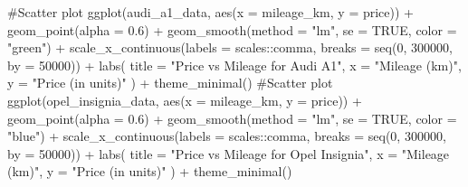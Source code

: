 \documentclass[
  letterpaper,
  DIV=11,
  numbers=noendperiod]{scrartcl}
\newenvironment{Shaded}{\begin{snugshade}}{\end{snugshade}}
\newcommand{\AttributeTok}[1]{\textcolor[rgb]{0.40,0.45,0.13}{#1}}
\newcommand{\CommentTok}[1]{\textcolor[rgb]{0.37,0.37,0.37}{#1}}
\newcommand{\ConstantTok}[1]{\textcolor[rgb]{0.56,0.35,0.01}{#1}}
\newcommand{\DecValTok}[1]{\textcolor[rgb]{0.68,0.00,0.00}{#1}}
\newcommand{\FloatTok}[1]{\textcolor[rgb]{0.68,0.00,0.00}{#1}}
\newcommand{\FunctionTok}[1]{\textcolor[rgb]{0.28,0.35,0.67}{#1}}
\newcommand{\NormalTok}[1]{\textcolor[rgb]{0.00,0.23,0.31}{#1}}
\newcommand{\SpecialCharTok}[1]{\textcolor[rgb]{0.37,0.37,0.37}{#1}}
\newcommand{\StringTok}[1]{\textcolor[rgb]{0.13,0.47,0.30}{#1}}
\begin{document}
\begin{Shaded}
\begin{Highlighting}[]
\CommentTok{\#Scatter plot}
\FunctionTok{ggplot}\NormalTok{(audi\_a1\_data, }\FunctionTok{aes}\NormalTok{(}\AttributeTok{x =}\NormalTok{ mileage\_km, }\AttributeTok{y =}\NormalTok{ price)) }\SpecialCharTok{+}
  \FunctionTok{geom\_point}\NormalTok{(}\AttributeTok{alpha =} \FloatTok{0.6}\NormalTok{) }\SpecialCharTok{+}
  \FunctionTok{geom\_smooth}\NormalTok{(}\AttributeTok{method =} \StringTok{"lm"}\NormalTok{, }\AttributeTok{se =} \ConstantTok{TRUE}\NormalTok{, }\AttributeTok{color =} \StringTok{"green"}\NormalTok{) }\SpecialCharTok{+}
  \FunctionTok{scale\_x\_continuous}\NormalTok{(}\AttributeTok{labels =}\NormalTok{ scales}\SpecialCharTok{::}\NormalTok{comma, }\AttributeTok{breaks =} \FunctionTok{seq}\NormalTok{(}\DecValTok{0}\NormalTok{, }\DecValTok{300000}\NormalTok{, }\AttributeTok{by =} \DecValTok{50000}\NormalTok{)) }\SpecialCharTok{+}
  \FunctionTok{labs}\NormalTok{(}
    \AttributeTok{title =} \StringTok{"Price vs Mileage for Audi A1"}\NormalTok{,}
    \AttributeTok{x =} \StringTok{"Mileage (km)"}\NormalTok{,}
    \AttributeTok{y =} \StringTok{"Price (in units)"}
\NormalTok{  ) }\SpecialCharTok{+}
  \FunctionTok{theme\_minimal}\NormalTok{()}
\CommentTok{\#Scatter plot}
\FunctionTok{ggplot}\NormalTok{(opel\_insignia\_data, }\FunctionTok{aes}\NormalTok{(}\AttributeTok{x =}\NormalTok{ mileage\_km, }\AttributeTok{y =}\NormalTok{ price)) }\SpecialCharTok{+}
  \FunctionTok{geom\_point}\NormalTok{(}\AttributeTok{alpha =} \FloatTok{0.6}\NormalTok{) }\SpecialCharTok{+}
  \FunctionTok{geom\_smooth}\NormalTok{(}\AttributeTok{method =} \StringTok{"lm"}\NormalTok{, }\AttributeTok{se =} \ConstantTok{TRUE}\NormalTok{, }\AttributeTok{color =} \StringTok{"blue"}\NormalTok{) }\SpecialCharTok{+}
  \FunctionTok{scale\_x\_continuous}\NormalTok{(}\AttributeTok{labels =}\NormalTok{ scales}\SpecialCharTok{::}\NormalTok{comma, }\AttributeTok{breaks =} \FunctionTok{seq}\NormalTok{(}\DecValTok{0}\NormalTok{, }\DecValTok{300000}\NormalTok{, }\AttributeTok{by =} \DecValTok{50000}\NormalTok{)) }\SpecialCharTok{+}
  \FunctionTok{labs}\NormalTok{(}
    \AttributeTok{title =} \StringTok{"Price vs Mileage for Opel Insignia"}\NormalTok{,}
    \AttributeTok{x =} \StringTok{"Mileage (km)"}\NormalTok{,}
    \AttributeTok{y =} \StringTok{"Price (in units)"}
\NormalTok{  ) }\SpecialCharTok{+}
  \FunctionTok{theme\_minimal}\NormalTok{()}


\end{Highlighting}
\end{Shaded}
\end{document}
